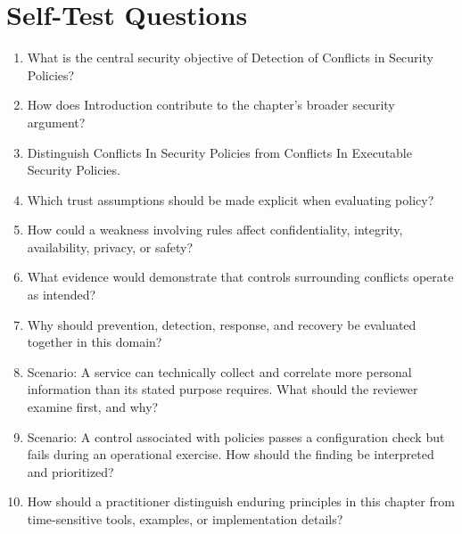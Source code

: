 \documentclass[11pt]{article}
\begin{document}
\section*{Self-Test Questions}
\begin{enumerate}
\item What is the central security objective of Detection of Conflicts in Security Policies?
\item How does Introduction contribute to the chapter's broader security argument?
\item Distinguish Conflicts In Security Policies from Conflicts In Executable Security Policies.
\item Which trust assumptions should be made explicit when evaluating policy?
\item How could a weakness involving rules affect confidentiality, integrity, availability, privacy, or safety?
\item What evidence would demonstrate that controls surrounding conflicts operate as intended?
\item Why should prevention, detection, response, and recovery be evaluated together in this domain?
\item Scenario: A service can technically collect and correlate more personal information than its stated purpose requires. What should the reviewer examine first, and why?
\item Scenario: A control associated with policies passes a configuration check but fails during an operational exercise. How should the finding be interpreted and prioritized?
\item How should a practitioner distinguish enduring principles in this chapter from time-sensitive tools, examples, or implementation details?
\end{enumerate}
\end{document}
